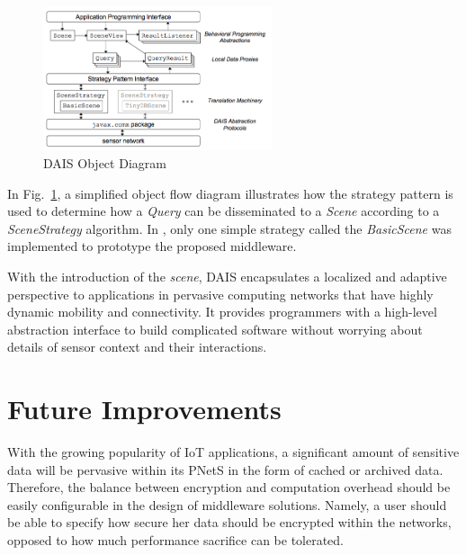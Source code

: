 \documentclass[11pt,onecolumn]{article}
\begin{document}
\begin{figure}
\vspace{-20pt}
  \begin{center}
    \includegraphics[width=0.6\textwidth]{resources/dais_objects.png}
  \end{center}
  \vspace{-20pt}
  \caption{DAIS Object Diagram\cite{dais} \label{dais_objects}}
    \vspace{-10pt}
\end{figure}

In Fig.~\ref{dais_objects}, a simplified object flow diagram illustrates how the strategy pattern\cite{gamma1993design} is used to determine how a {\em Query} can be disseminated to a {\em Scene} according to a {\em SceneStrategy} algorithm. In \cite{dais}, only one simple strategy called the {\em BasicScene} was implemented to prototype the proposed middleware. 

With the introduction of the {\em scene}, DAIS encapsulates a localized and adaptive perspective to applications in pervasive computing networks that have highly dynamic mobility and connectivity. It provides programmers with a high-level abstraction interface to build complicated software without worrying about details of sensor context and their interactions.
	
\section{Future Improvements}
With the growing popularity of IoT applications, a significant amount of sensitive data will be pervasive within its PNetS in the form of cached or archived data. Therefore, the balance between encryption and computation overhead should be easily configurable in the design of middleware solutions. Namely, a user should be able to specify how secure her data should be encrypted within the networks, opposed to how much performance sacrifice can be tolerated. 
\end{document}
